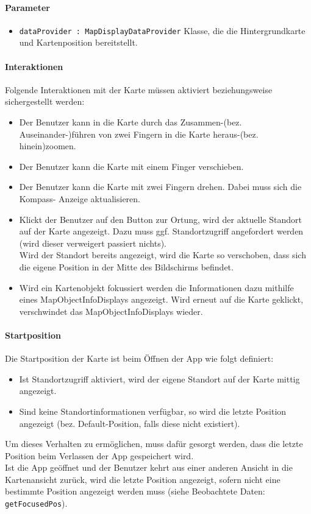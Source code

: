 \paragraph*{Parameter}
\begin{itemize}
    \item \texttt{dataProvider : MapDisplayDataProvider} Klasse, die die Hintergrundkarte und Kartenposition bereitstellt.
\end{itemize}

\paragraph*{Interaktionen}
Folgende Interaktionen mit der Karte müssen aktiviert beziehungsweise sichergestellt werden:
\begin{itemize}
    \item Der Benutzer kann in die Karte durch das Zusammen-(bez. Auseinander-)führen von zwei 
    Fingern in die Karte heraus-(bez. hinein)zoomen.
    \item Der Benutzer kann die Karte mit einem Finger verschieben.
    \item Der Benutzer kann die Karte mit zwei Fingern drehen. Dabei muss sich die Kompass-
    Anzeige aktualisieren.
    \item Klickt der Benutzer auf den Button zur Ortung, wird der aktuelle Standort auf der Karte 
    angezeigt. Dazu muss ggf. Standortzugriff angefordert werden (wird dieser verweigert passiert 
    nichts).\\
    Wird der Standort bereits angezeigt, wird die Karte so verschoben, dass sich die eigene Position 
    in der Mitte des Bildschirms befindet. \\
    \item Wird ein Kartenobjekt fokussiert werden die Informationen dazu mithilfe eines MapObjectInfoDisplays angezeigt. 
    Wird erneut auf die Karte geklickt, verschwindet das MapObjectInfoDisplays wieder.

\end{itemize}

\paragraph*{Startposition}
Die Startposition der Karte ist beim Öffnen der App wie folgt definiert:
\begin{itemize}
    \item Ist Standortzugriff aktiviert, wird der eigene Standort auf der Karte mittig angezeigt.
    \item Sind keine Standortinformationen verfügbar, so wird die letzte Position angezeigt 
    (bez. Default-Position, falls diese nicht existiert).
\end{itemize}
Um dieses Verhalten zu ermöglichen, muss dafür gesorgt werden, dass die letzte Position beim Verlassen 
der App gespeichert wird.\\
Ist die App geöffnet und der Benutzer kehrt aus einer anderen Ansicht in die Kartenansicht zurück,
wird die letzte Position angezeigt, sofern nicht eine bestimmte Position angezeigt werden muss 
(siehe Beobachtete Daten: \texttt{getFocusedPos}).

